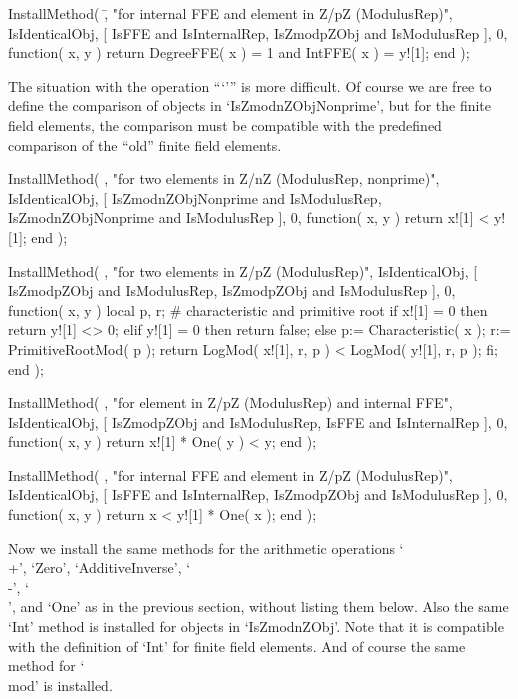     InstallMethod( \=,
        "for internal FFE and element in Z/pZ (ModulusRep)",
        IsIdenticalObj,
        [ IsFFE and IsInternalRep, IsZmodpZObj and IsModulusRep ], 0,
        function( x, y )
        return DegreeFFE( x ) = 1 and IntFFE( x ) = y![1];
        end );
\endtt

The situation with the operation ```\<''' is more difficult.
Of course we are free to define the comparison of objects in
`IsZmodnZObjNonprime',
but for the finite field elements, the comparison must be compatible
with the predefined comparison of the ``old'' finite field elements.

\begintt
    InstallMethod( \<,
        "for two elements in Z/nZ (ModulusRep, nonprime)",
        IsIdenticalObj,
        [ IsZmodnZObjNonprime and IsModulusRep,
          IsZmodnZObjNonprime and IsModulusRep ], 0,
        function( x, y ) return x![1] < y![1]; end );

    InstallMethod( \<,
        "for two elements in Z/pZ (ModulusRep)",
        IsIdenticalObj,
        [ IsZmodpZObj and IsModulusRep,
          IsZmodpZObj and IsModulusRep ], 0,
        function( x, y )
        local p, r;      # characteristic and primitive root
        if x![1] = 0 then
          return y![1] <> 0;
        elif y![1] = 0 then
          return false;
        else
          p:= Characteristic( x );
          r:= PrimitiveRootMod( p );
          return LogMod( x![1], r, p ) < LogMod( y![1], r, p );
        fi;
        end );

    InstallMethod( \<,
        "for element in Z/pZ (ModulusRep) and internal FFE",
        IsIdenticalObj,
        [ IsZmodpZObj and IsModulusRep, IsFFE and IsInternalRep ], 0,
        function( x, y )
        return x![1] * One( y ) < y;
        end );

    InstallMethod( \<,
        "for internal FFE and element in Z/pZ (ModulusRep)",
        IsIdenticalObj,
        [ IsFFE and IsInternalRep, IsZmodpZObj and IsModulusRep ], 0,
        function( x, y )
        return x < y![1] * One( x );
        end );
\endtt

Now we install the same methods for the arithmetic operations
`\\+', `Zero', `AdditiveInverse', `\\-', `\\\*', and `One'
as in the previous section, without listing them below.
Also the same `Int' method is installed for objects in `IsZmodnZObj'.
Note that it is compatible with the definition of `Int' for finite
field elements.
And of course the same method for `\\mod' is installed.

